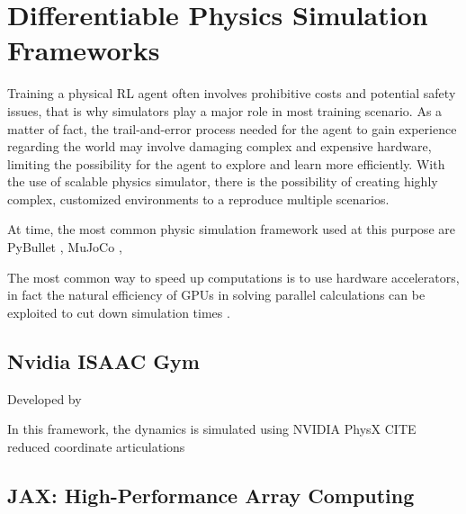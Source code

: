 \chapter{Differentiable Physics Simulation Frameworks}
\label{chp:back_PhysicsSimulators}

Training a physical \ac{RL} agent often involves prohibitive costs and potential safety issues, that is why simulators play a major role in most training scenario. As a matter of fact, the trail-and-error process needed for the agent to gain experience regarding the world may involve damaging complex and expensive hardware, limiting the possibility for the agent to explore and learn more efficiently.
With the use of scalable physics simulator, there is the possibility of creating highly complex, customized environments to a reproduce multiple scenarios.

At time, the most common physic simulation framework used at this purpose are PyBullet \cite{coumans_pybullet_2016}, MuJoCo \cite{todorov_mujoco_2012},

The most common way to speed up computations is to use hardware accelerators, in fact the natural efficiency of \ac{GPU}s in solving parallel calculations can be exploited to cut down simulation times \cite{liang_gpu-accelerated_2018}.

\section{Nvidia ISAAC Gym}

Developed by \cite{makoviychuk_isaac_2021}

In this framework, the dynamics is simulated using NVIDIA PhysX CITE reduced coordinate articulations

\section{JAX: High-Performance Array Computing}

